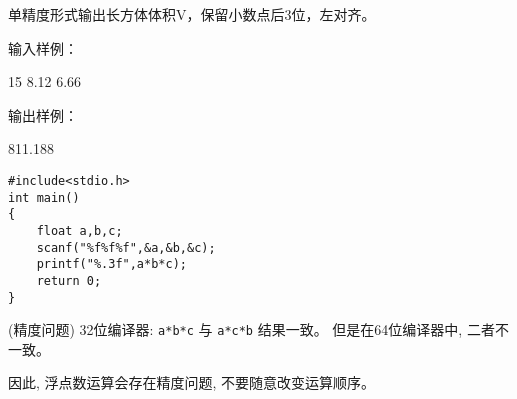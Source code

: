 单精度形式输出长方体体积V，保留小数点后3位，左对齐。

输入样例：

15  8.12  6.66

输出样例：

811.188


\begin{lstlisting}
#include<stdio.h>   
int main()                   
{  
	float a,b,c;
	scanf("%f%f%f",&a,&b,&c);
	printf("%.3f",a*b*c); 
	return 0;           
}                  
\end{lstlisting}

\begin{note}(精度问题)
	32位编译器: \lstinline|a*b*c| 与 \lstinline|a*c*b| 结果一致。
	但是在64位编译器中, 二者不一致。
	
	因此, 浮点数运算会存在精度问题, 不要随意改变运算顺序。
\end{note}
